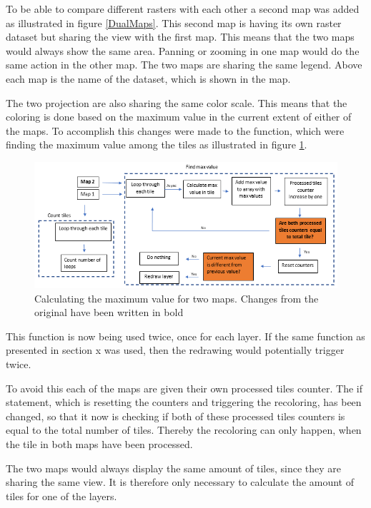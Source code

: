 To be able to compare different rasters with each other a second map was added as illustrated in figure \ref{DualMaps}. This second map is having its own raster dataset but sharing the view with the first map. This means that the two maps would always show the same area. Panning or zooming in one map would do the same action in the other map. The two maps are sharing the same legend. Above each map is the name of the dataset, which is shown in the map.  

The two projection are also sharing the same color scale. This means that the coloring is done based on the maximum value in the current extent of either of the maps. To accomplish this changes were made to the function, which were finding the maximum value among the tiles as illustrated in figure \ref{ChangeToMaxCalculation}.
 
\begin{figure} [H]
	\centering
	\includegraphics[width=.8\textwidth]{Pictures/ChangeToMaxCalculation}
	\caption{Calculating the maximum value for two maps. Changes from the original have been written in bold}
	\label{ChangeToMaxCalculation}
\end{figure}

This function is now being used twice, once for each layer. If the same function as presented in section x was used, then the redrawing would potentially trigger twice. 

To avoid this each of the maps are given their own processed tiles counter. The if statement, which is resetting the counters and triggering the recoloring, has been changed, so that it now is checking if both of these processed tiles counters is equal to the total number of tiles. Thereby the recoloring can only happen, when the tile in both maps have been processed. 

The two maps would always display the same amount of tiles, since they are sharing the same view. It is therefore only necessary to calculate the amount of tiles for one of the layers. 

